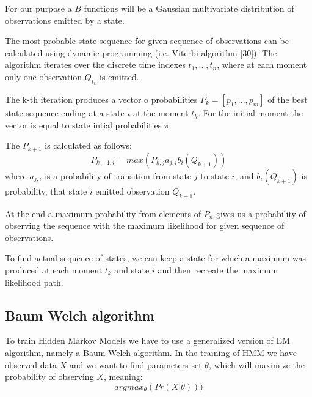 \documentclass[12pt,a4paper,english]{article}
\begin{document}
For our purpose a $B$ functions will be a Gaussian multivariate distribution of observations emitted by a state. \newline

The most probable state sequence for given sequence of observations can be calculated using dynamic programming (i.e. Viterbi algorithm [30]). \newline
The algorithm iterates over the discrete time indexes $t_1, ..., t_n$, where at each moment only one observation $Q_{t_k}$ is emitted. \newline

The k-th iteration produces a vector o probabilities $P_k=[p_1, ..., p_m]$ of the best state sequence ending at a state $i$ at the moment $t_k$.
For the initial moment the vector is equal to state intial probabilities $\pi$. \newline

The $P_{k+1}$ is calculated as follows:
\begin{equation}
    P_{k+1, i} = max(P_{k, j} a_{j, i} b_i(Q_{k+1}))
\end{equation}
where $a_{j, i}$ is a probability of transition from state $j$ to state $i$, \newline
and $b_i(Q_{k+1})$ is probability, that state $i$ emitted observation $Q_{k+1}$. \newline

At the end a maximum probability from elements of $P_n$ gives us a probability of observing the sequence with the maximum likelihood for given sequence of observations. \newline

To find actual sequence of states, we can keep a state for which a maximum was produced at each moment $t_k$ and state $i$ and then recreate the maximum likelihood path.

\newpage
\subsection{Baum Welch algorithm}

To train Hidden Markov Models we have to use a generalized version of EM algorithm, namely a Baum-Welch algorithm. \newline
In the training of HMM we have observed data $X$ and we want to find parameters set $\theta$, which will maximize the probability of observing $X$, meaning:
\begin{equation}
    argmax_\theta(Pr(X | \theta)))
\end{equation}
\end{document}
